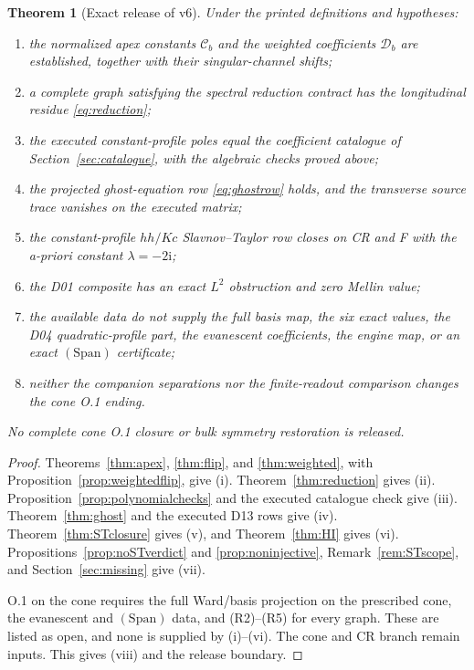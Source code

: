 \documentclass[11pt,a4paper]{article}
\newcommand{\ii}{\mathrm i}
\newcommand{\Ccb}{\mathcal C}
\newcommand{\Span}{(\mathrm{Span})}
\theoremstyle{plain}
\newtheorem{theorem}{Theorem}[section]
\theoremstyle{definition}
\theoremstyle{remark}
\numberwithin{equation}{section}
\begin{document}
\begin{theorem}[Exact release of v6]
\label{thm:release}
Under the printed definitions and hypotheses:
\begin{enumerate}[label=\textup{(\roman*)}]
\item the normalized apex constants \(\Ccb_b\) and the weighted
coefficients \(\mathcal D_b\) are established, together with their
singular-channel shifts;
\item a complete graph satisfying the spectral reduction contract
has the longitudinal residue \eqref{eq:reduction};
\item the executed constant-profile poles equal the coefficient
catalogue of Section~\ref{sec:catalogue}, with the algebraic checks
proved above;
\item the projected ghost-equation row \eqref{eq:ghostrow} holds,
and the transverse source trace vanishes on the executed matrix;
\item the constant-profile \(hh/Kc\) Slavnov--Taylor row closes on
CR and F with the a-priori constant \(\lambda=-2\ii\);
\item the D01 composite has an exact \(L^2\) obstruction and zero
Mellin value;
\item the available data do not supply the full basis map, the six
exact values, the D04 quadratic-profile part, the evanescent
coefficients, the engine map, or an exact \(\Span\) certificate;
\item neither the companion separations nor the finite-readout
comparison changes the cone O.1 ending.
\end{enumerate}
No complete cone O.1 closure or bulk symmetry restoration is
released.
\end{theorem}

\begin{proof}
Theorems~\ref{thm:apex}, \ref{thm:flip}, and \ref{thm:weighted},
with Proposition~\ref{prop:weightedflip}, give (i).
Theorem~\ref{thm:reduction} gives (ii).
Proposition~\ref{prop:polynomialchecks} and the executed catalogue
check give (iii).
Theorem~\ref{thm:ghost} and the executed D13 rows give (iv).
Theorem~\ref{thm:STclosure} gives (v), and Theorem~\ref{thm:HI}
gives (vi).
Propositions~\ref{prop:noSTverdict} and \ref{prop:noninjective},
Remark~\ref{rem:STscope}, and Section~\ref{sec:missing} give (vii).

O.1 on the cone requires the full Ward/basis projection on the
prescribed cone, the evanescent and \(\Span\) data, and (R2)--(R5)
for every graph.
These are listed as open, and none is supplied by (i)--(vi).
The cone and CR branch remain inputs.
This gives (viii) and the release boundary.
\end{proof}
\end{document}
